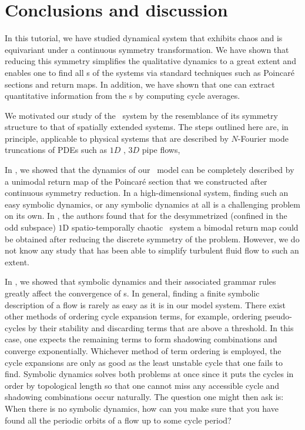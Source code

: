 \section{Conclusions and discussion}
\label{s:concl}

In this tutorial, we have studied  dynamical 
system that exhibits chaos and is equivariant under a continuous 
symmetry transformation. We have shown that reducing this symmetry 
simplifies the qualitative dynamics to a great extent and enables 
one to find all \rpo s of the systems via standard techniques such 
as Poincar\'e sections and return maps. In addition, we have shown 
that one can extract quantitative information from the \rpo s by 
computing cycle averages.

We motivated our study of the \twomode\ system by the resemblance of its
symmetry structure to that of spatially extended systems. The
steps outlined here are, in principle, applicable to physical systems
that are described by $N$-Fourier mode truncations of PDEs such as $1D$
\KS, $3D$ pipe flows, \etc

In , we showed that the dynamics of our \twomode\ model 
can be completely described by a unimodal return map of the Poincar\'e 
section that we constructed after continuous symmetry reduction. In a 
high-dimensional system, finding such an easy symbolic dynamics, 
or any symbolic dynamics at all is a challenging problem on its 
own. In , the authors found that for 
the desymmetrized (confined in the odd subspace) $1$D 
spatio-temporally chaotic \KS\ system a bimodal return map could 
be obtained after reducing the discrete symmetry of the 
problem. However, we do not know any study that has been able to 
simplify turbulent fluid flow to such an extent.

In , we showed that symbolic dynamics and their
associated grammar rules greatly affect the convergence of \cycForm s.
In general, finding a finite symbolic description of a flow is
rarely as easy as it is in our model system.
There exist other methods of ordering cycle
expansion terms, for example, ordering pseudo-cycles by their stability and discarding terms
that are above a threshold. In this case, one expects the remaining terms to form
shadowing combinations and converge exponentially.
Whichever method of term ordering is employed, the cycle expansions are only as good
as the least unstable cycle that one fails to find. Symbolic dynamics solves both 
problems at once since it puts the cycles in order by topological length so that
one cannot miss any accessible cycle and shadowing combinations occur naturally. 
The question one might then ask is: When there is no symbolic dynamics, how can you make 
sure that you have found all the periodic orbits of a flow up to some cycle period?

